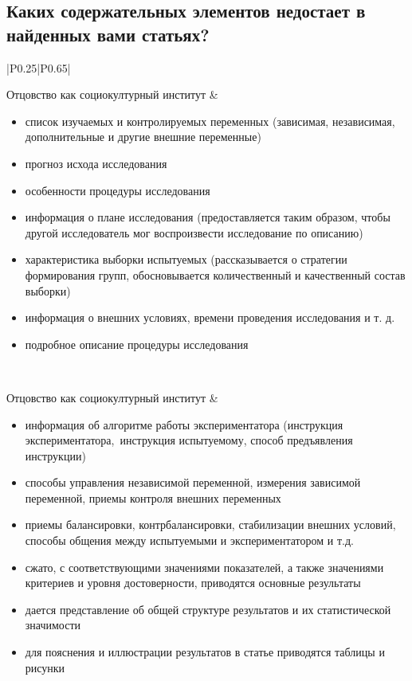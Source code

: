 \documentclass{../../common/thesisbyxetex}
\begin{document}
\subsection*{Каких содержательных элементов недостает в найденных вами статьях?}
\begin{longtable}[t]{|P{0.25\textwidth}|P{0.65\textwidth}|}
\hline
\endfirsthead
{}
\endhead
\endfoot
\endlastfoot

Отцовство как социокултурный институт &
\begin{itemize}
 \item список изучаемых и контролируемых переменных (зависимая, независимая, дополнительные и другие внешние
переменные)
 \item прогноз исхода исследования
\item особенности процедуры исследования
\item информация о плане исследования (предоставляется таким образом, чтобы другой исследователь мог воспроизвести
исследование по описанию)
\item характеристика выборки испытуемых (рассказывается о стратегии формирования групп, обосновывается количественный и
качественный состав выборки)
\item информация о внешних условиях, времени проведения исследования и т. д.
\item подробное описание процедуры исследования
\end{itemize}
\\ \hline

Отцовство как социокултурный институт &
\begin{itemize}
\item информация об алгоритме работы экспериментатора (инструкция экспериментатора, инструкция испытуемому, способ
предъявления инструкции)
\item способы управления независимой переменной, измерения зависимой переменной, приемы контроля внешних переменных
\item приемы балансировки, контрбалансировки, стабилизации внешних условий, способы общения между испытуемыми и
экспериментатором и т.д.
\item сжато, с соответствующими значениями показателей, а также значениями критериев и уровня достоверности, приводятся
основные результаты
\item дается представление об общей структуре результатов и их статистической значимости
\item для пояснения и иллюстрации результатов в статье приводятся таблицы и рисунки
\end{itemize}
\\ \hline



\end{longtable}
\end{document}
